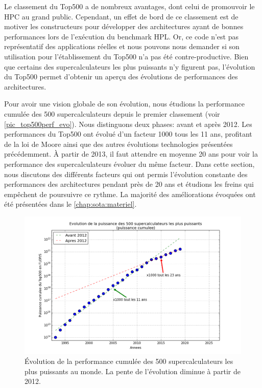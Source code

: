     Le classement du Top500 a de nombreux avantages, dont celui de promouvoir le HPC au grand public. Cependant, un effet de bord de ce classement est de motiver les constructeurs pour développer des architectures ayant de bonnes performances lors de l'exécution du benchmark HPL. Or, ce code n'est pas représentatif des applications réelles et nous pouvons nous demander si son utilisation pour l'établissement du Top500 n'a pas été contre-productive. Bien que certains des supercalculateurs les plus puissants n'y figurent pas, l'évolution du Top500 permet d'obtenir un aperçu des évolutions de performances des architectures.
    
    Pour avoir une vision globale de son évolution, nous étudions la performance cumulée des 500 supercalculateurs depuis le premier classement (voir \autoref{pic_top500perf_evo}). Nous distinguons deux phases: avant et après 2012. 
    Les performances du Top500 ont évolué d'un facteur 1000 tous les 11 ans, profitant de la loi de Moore ainsi que des autres évolutions technologies présentées précédemment. À partir de 2013, il faut attendre en moyenne 20 ans pour voir la performance des supercalculateurs évoluer du même facteur.
    Dans cette section, nous discutons des différents facteurs qui ont permis l'évolution constante des performances des architectures pendant près de 20 ans et étudions les freins qui empêchent de poursuivre ce rythme. La majorité des améliorations évoquées ont été présentées dans le \autoref{chap:sota:materiel}.

    
    \begin{figure}
        \center
        \includegraphics[width=12cm]{images/top500_evolution.png}
        \caption{\label{pic_top500perf_evo} Évolution de la performance cumulée des 500 supercalculateurs les plus puissants au monde. La pente de l'évolution diminue à partir de 2012.}
    \end{figure}


